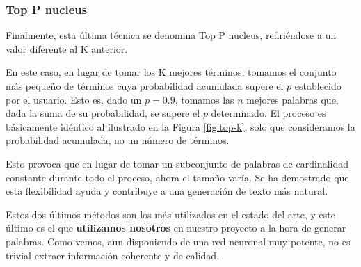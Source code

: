\subsubsection{Top P nucleus}

Finalmente, esta última técnica se denomina Top P nucleus, refiriéndose a un valor diferente al K anterior.

En este caso, en lugar de tomar los K mejores términos, tomamos el conjunto más pequeño de términos cuya probabilidad acumulada supere el $p$ establecido por el usuario. Esto es, dado un $p = 0.9$, tomamos las $n$ mejores palabras que, dada la suma de su probabilidad, se supere el $p$ determinado. El proceso es básicamente idéntico al ilustrado en la Figura \ref{fig:top-k}, solo que consideramos la probabilidad acumulada, no un número de términos.

Esto provoca que en lugar de tomar un subconjunto de palabras de cardinalidad constante durante todo el proceso, ahora el tamaño varía. Se ha demostrado que esta flexibilidad ayuda y contribuye a una generación de texto más natural.

Estos dos últimos métodos son los más utilizados en el estado del arte, y este último es el que \textbf{utilizamos nosotros} en nuestro proyecto a la hora de generar palabras. Como vemos, aun disponiendo de una red neuronal muy potente, no es trivial extraer información coherente y de calidad.